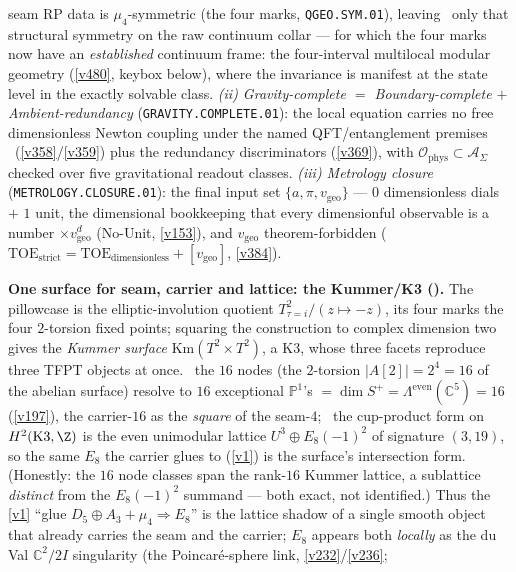 seam RP data is $\mu_4$-symmetric (the four marks, \texttt{QGEO.SYM.01}), leaving \mO\ only that structural
symmetry on the raw continuum collar --- for which the four marks now have an \emph{established} continuum frame:
the four-interval multilocal modular geometry (\vref{v480}, keybox below), where the invariance is manifest at the
state level in the exactly solvable class.
\emph{(ii) Gravity-complete $=$ Boundary-complete $+$ Ambient-redundancy} (\texttt{GRAVITY.COMPLETE.01}): the local
equation carries no free dimensionless Newton coupling under the named QFT/entanglement premises \mC\ (\vref{v358}/\vref{v359}) plus the redundancy discriminators (\vref{v369}), with
$\mathcal O_{\mathrm{phys}}\subset\mathcal A_\Sigma$ checked over five gravitational readout classes.
\emph{(iii) Metrology closure} (\texttt{METROLOGY.CLOSURE.01}): the final input set $\{a,\pi,v_{\mathrm{geo}}\}$ ---
$0$ dimensionless dials $+$ $1$ unit, the dimensional bookkeeping that every dimensionful observable is a number
$\times v_{\mathrm{geo}}^d$ (No-Unit, \vref{v153}), and $v_{\mathrm{geo}}$ theorem-forbidden
($\mathrm{TOE}_{\mathrm{strict}}{=}\mathrm{TOE}_{\mathrm{dimensionless}}{+}[v_{\mathrm{geo}}]$, \vref{v384}).
\par\smallskip\noindent\textbf{One surface for seam, carrier and lattice: the Kummer/K3
().} The pillowcase is the elliptic-involution quotient
$T^2_{\tau=i}/(z{\mapsto}{-}z)$, its four marks the four $2$-torsion fixed points; squaring the construction
to complex dimension two gives the \emph{Kummer surface} $\mathrm{Km}(T^2{\times}T^2)$, a K3, whose three
facets reproduce three TFPT objects at once. \mE\ the $16$ nodes (the $2$-torsion $|A[2]|{=}2^4{=}16$ of the
abelian surface) resolve to $16$ exceptional $\mathbb P^1$'s $=\dim S^+=\Lambda^{\mathrm{even}}(\mathbb
C^5)=16$ (\vref{v197}), the carrier-$16$ as the \emph{square} of the seam-$4$; \mE\ the cup-product form on
$H^2(\mathrm{K3},\Z)$ is the even unimodular lattice $U^3\oplus E_8({-}1)^2$ of signature $(3,19)$, so the
same $E_8$ the carrier glues to (\vref{v1}) is the surface's intersection form. (Honestly: the $16$ node
classes span the rank-$16$ Kummer lattice, a sublattice \emph{distinct} from the $E_8({-}1)^2$ summand ---
both exact, not identified.) Thus the \vref{v1} ``glue $D_5{\oplus}A_3{+}\mu_4{\Rightarrow}E_8$'' is the
lattice shadow of a single smooth object that already carries the seam and the carrier; $E_8$ appears both
\emph{locally} as the du Val $\mathbb C^2/2I$ singularity (the Poincar\'e-sphere link, \vref{v232}/\vref{v236};
